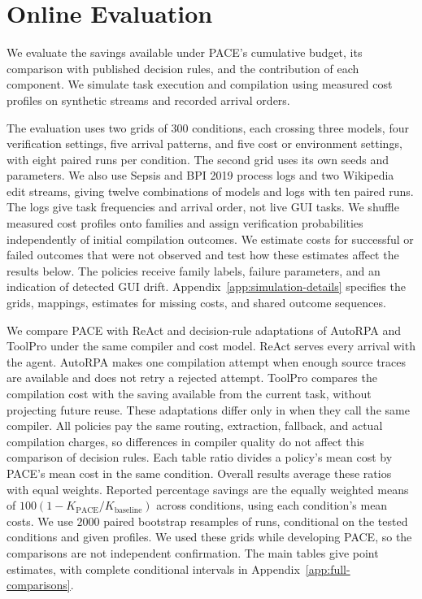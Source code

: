 \section{Online Evaluation}
\label{sec:eval}

We evaluate the savings available under PACE's cumulative budget, its comparison with published decision rules, and the contribution of each component.
We simulate task execution and compilation using measured cost profiles on synthetic streams and recorded arrival orders.

The evaluation uses two grids of $300$ conditions, each crossing three models, four verification settings, five arrival patterns, and five cost or environment settings, with eight paired runs per condition.
The second grid uses its own seeds and parameters.
We also use Sepsis and BPI 2019 process logs \citep{mannhardt2016sepsis,vandongen2019bpi} and two Wikipedia edit streams, giving twelve combinations of models and logs with ten paired runs.
The logs give task frequencies and arrival order, not live GUI tasks.
We shuffle measured cost profiles onto families and assign verification probabilities independently of initial compilation outcomes.
We estimate costs for successful or failed outcomes that were not observed and test how these estimates affect the results below.
The policies receive family labels, failure parameters, and an indication of detected GUI drift.
Appendix~\ref{app:simulation-details} specifies the grids, mappings, estimates for missing costs, and shared outcome sequences.

We compare PACE with ReAct \citep{yao2023react} and decision-rule adaptations of AutoRPA \citep{chen2026autorpa} and ToolPro \citep{liu2026toolpro} under the same compiler and cost model.
ReAct serves every arrival with the agent.
AutoRPA makes one compilation attempt when enough source traces are available and does not retry a rejected attempt.
ToolPro compares the compilation cost with the saving available from the current task, without projecting future reuse.
These adaptations differ only in when they call the same compiler.
All policies pay the same routing, extraction, fallback, and actual compilation charges, so differences in compiler quality do not affect this comparison of decision rules.
Each table ratio divides a policy's mean cost by PACE's mean cost in the same condition.
Overall results average these ratios with equal weights.
Reported percentage savings are the equally weighted means of $100(1-K_{\mathrm{PACE}}/K_{\mathrm{baseline}})$ across conditions, using each condition's mean costs.
We use $2000$ paired bootstrap resamples of runs, conditional on the tested conditions and given profiles.
We used these grids while developing PACE, so the comparisons are not independent confirmation.
The main tables give point estimates, with complete conditional intervals in Appendix~\ref{app:full-comparisons}.

